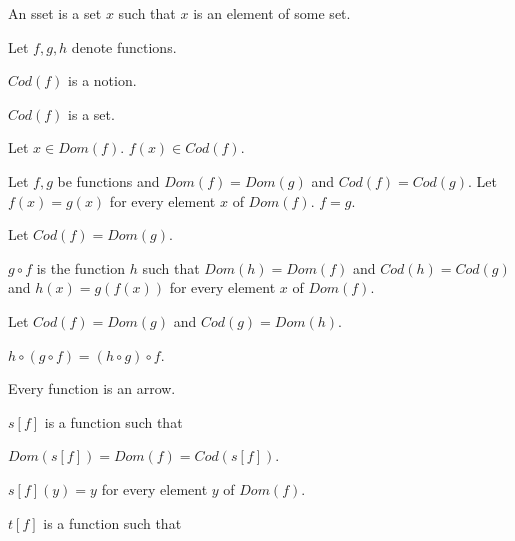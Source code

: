\documentclass{article}
\begin{document}
	\begin{forthel}
		

		\begin{definition} 
			An sset is a set $x$ such that $x$ is an element of some set.
		\end{definition}
		
		Let $f,g,h$ denote functions.
		
		\begin{signature} 
			$Cod(f)$ is a notion. 
		\end{signature}

		\begin{axiom} 
			$Cod(f)$ is a set. 
		\end{axiom}
		
		\begin{axiom} 
			Let $x \in  Dom(f)$. $f(x) \in Cod(f)$.
		\end{axiom}

		\begin{axiom}[Ext]
			Let $f,g$ be functions and $Dom(f) = Dom(g)$ and $Cod(f) = Cod(g)$.
			Let $f(x) = g(x)$ for every element $x$ of $Dom(f)$.
			$f = g$.
		\end{axiom}
		
		\begin{definition} 
			Let $Cod(f)=Dom(g)$. 
			
			$g \circ f$ is the function $h$ such that
			$Dom(h)=Dom(f)$ and $Cod(h)=Cod(g)$ and $h(x)=g(f(x))$ for every element $x$ of $Dom(f)$.
		\end{definition}
		
		\begin{lemma} 
			Let $Cod(f)=Dom(g)$ and $Cod(g)=Dom(h)$.
			
			$h \circ (g \circ f) = (h \circ g) \circ f$.
		\end{lemma}
		
		\begin{axiom}
			Every function is an arrow.
		\end{axiom}
		
		\begin{axiom}		
			$s[f]$ is a function such that 
			
			$Dom(s[f])=Dom(f)=Cod(s[f])$.
		\end{axiom}
		
		\begin{axiom} 
			$s[f](y)=y$ for every element $y$ of $Dom(f)$.
		\end{axiom}
		

		\begin{axiom}		
			$t[f]$ is a function such that 
			

\end{axiom}
\end{forthel}
\end{document}

